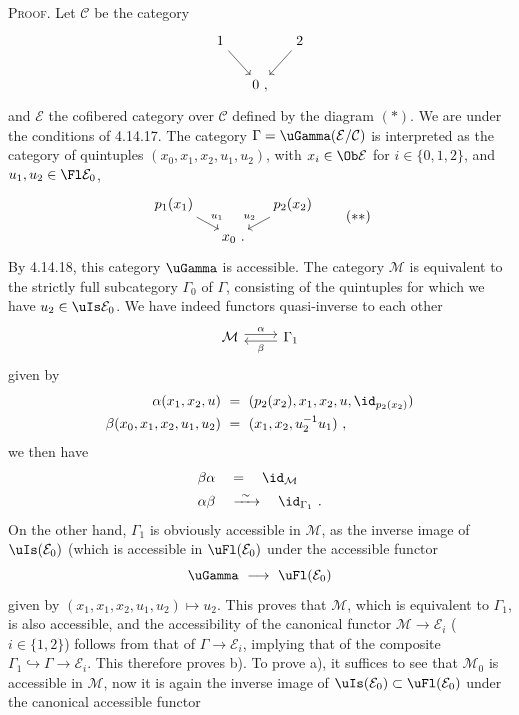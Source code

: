 \noindent\textsc{Proof}. Let $\mathcal{C}$ be the category
\[
\begin{tikzcd}[column sep=small]
1 \arrow[dr] & & 2 \arrow[dl] \\
& 0 \ , &
\end{tikzcd}
\]
and $\mathcal{E}$ the cofibered category over $\mathcal{C}$ defined by the diagram $(*)$. We are under the conditions of 4.14.17. The category $\Gamma = \uGamma(\mathcal{E}/\mathcal{C})$ is interpreted
as the category of quintuples $(x_0,x_1,x_2,u_1,u_2)$, with $x_i \in \Ob\mathcal{E}$ for $i \in \{0,1,2\}$, and $u_1, u_2 \in \Fl\mathcal{E}_0$,
\[
\begin{tikzcd}[column sep=small, row sep=small]
p_1(x_1) \arrow[dr, "u_1"] & & p_2(x_2) \arrow[dl, "u_2"'] \\
& x_0 \ . &
\end{tikzcd}
\tag*{$(**)$}
\]
By 4.14.18, this category $\uGamma$ is accessible. The category $\mathcal{M}$ is equivalent to the strictly full subcategory $\Gamma_0$ of $\Gamma$, consisting of the quintuples for which we have $u_2 \in \uIs\mathcal{E}_0$. We have indeed functors quasi-inverse to each other %
\[
\begin{tikzcd}
\mathcal{M} \arrow[r, shift left, "\alpha"] & \Gamma_1 \arrow[l, shift left, "\beta"]
\end{tikzcd}
\]
given by
\[
\begin{aligned}
\alpha(x_1,x_2,u) \ &= \ (p_2(x_2),x_1,x_2,u,\id_{p_2(x_2)})\\
\beta(x_0,x_1,x_2,u_1,u_2) \ &= \ (x_1,x_2,u_2^{-1}u_1) \ ,
\end{aligned}
\]
we then have
\[
\begin{aligned}
\beta\alpha \quad &= \quad \id_{\mathcal{M}}\\
\alpha\beta \quad &\xrightarrow{\ \sim\ } \quad \id_{\Gamma_1} \ .
\end{aligned}
\]
On the other hand, $\Gamma_1$ is obviously accessible in $\mathcal{M}$, as the inverse image of $\uIs(\mathcal{E}_0)$ (which %
{}
is accessible in $\uFl(\mathcal{E}_0)$ under the accessible functor
\[
\uGamma \ \longrightarrow \ \uFl(\mathcal{E}_0)
\]
given by $(x_1, x_1, x_2, u_1, u_2) \longmapsto u_2$. This proves that $\mathcal{M}$, which is equivalent to $\Gamma_1$, is also accessible, and the accessibility of the canonical functor $\mathcal{M} \longrightarrow \mathcal{E}_i$ ($i \in \{1,2\}$) follows from that of $\Gamma \longrightarrow \mathcal{E}_i$, implying that of the composite $\Gamma_1 \hookrightarrow \Gamma \longrightarrow \mathcal{E}_i$. This therefore proves b). To prove a), it suffices to see that $\mathcal{M}_0$ is accessible in $\mathcal{M}$, now it is again the inverse image of $\uIs(\mathcal{E}_0) \subset \uFl(\mathcal{E}_0)$ under the canonical accessible functor %
